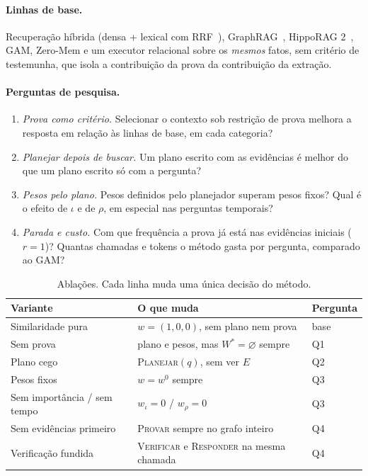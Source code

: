 \documentclass[11pt]{article}
\theoremstyle{definition}
\theoremstyle{plain}
\newcommand{\op}[1]{\textsc{#1}}
\begin{document}
\paragraph{Linhas de base.} Recuperação híbrida (densa + lexical com
RRF~\citep{cormack2009rrf}), GraphRAG~\citep{edge2024graphrag},
HippoRAG 2~\citep{gutierrez2025hipporag2}, GAM, Zero-Mem e um executor
relacional sobre os \emph{mesmos} fatos, sem critério de testemunha, que
isola a contribuição da prova da contribuição da extração.

\paragraph{Perguntas de pesquisa.}
\begin{enumerate}[label=\textbf{Q\arabic*},leftmargin=*,itemsep=1pt]
\item \emph{Prova como critério.} Selecionar o contexto sob restrição de
  prova melhora a resposta em relação às linhas de base, em cada categoria?
\item \emph{Planejar depois de buscar.} Um plano escrito com as evidências é
  melhor do que um plano escrito só com a pergunta?
\item \emph{Pesos pelo plano.} Pesos definidos pelo planejador superam pesos
  fixos? Qual é o efeito de $\iota$ e de $\rho$, em especial nas perguntas
  temporais?
\item \emph{Parada e custo.} Com que frequência a prova já está nas
  evidências iniciais ($r=1$)? Quantas chamadas e tokens o método gasta por
  pergunta, comparado ao GAM?
\end{enumerate}

\begin{table}[H]
\centering
\small
\begin{tabularx}{\textwidth}{@{}l Y l@{}}
\toprule
Variante & O que muda & Pergunta \\
\midrule
Similaridade pura & $w=(1,0,0)$, sem plano nem prova & base \\
Sem prova & plano e pesos, mas $W^\ast=\varnothing$ sempre & Q1 \\
Plano cego & \op{Planejar}$(q)$, sem ver $E$ & Q2 \\
Pesos fixos & $w=w^0$ sempre & Q3 \\
Sem importância / sem tempo & $w_\iota=0$ / $w_\rho=0$ & Q3 \\
Sem evidências primeiro & \op{Provar} sempre no grafo inteiro & Q4 \\
Verificação fundida & \op{Verificar} e \op{Responder} na mesma chamada & Q4 \\
\bottomrule
\end{tabularx}
\caption{Ablações. Cada linha muda uma única decisão do método.}
\label{tab:ablacoes}
\end{table}
\end{document}
